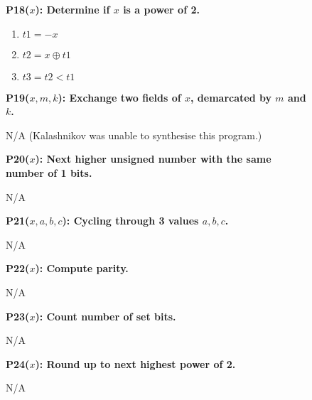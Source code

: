 \begin{figure}
\begin{multicols}{4}
   \begin{minipage}{.2\textwidth}
   \bf{P18}($x$): Determine if $x$ is a power of 2.
   \begin{enumerate}
    \item $t1 = -x$
    \item $t2 = x \oplus t1$
    \item $t3 = t2 < t1$
   \end{enumerate}
   \end{minipage}
   \vspace{12pt}
  
   
   
   \begin{minipage}{.2\textwidth}
   {\bf P19($x, m, k$): Exchange two fields of $x$, demarcated by $m$ and $k$.}

   N/A ({\sc Kalashnikov} was unable to synthesise this program.)
   \end{minipage}
   \vspace{12pt}
   
   \begin{minipage}{.2\textwidth}
   {\bf P20($x$): Next higher unsigned number with the same number of 1 bits.}

   N/A
   \end{minipage}
   \vspace{12pt}
   
   \begin{minipage}{.2\textwidth}
   {\bf P21($x, a, b, c$): Cycling through 3 values $a, b, c$.}

    N/A
   \end{minipage}
   \vspace{12pt}
   
   \begin{minipage}{.2\textwidth}
   {\bf P22($x$): Compute parity.}

    N/A
   \end{minipage}
   \vspace{12pt}
   
   \begin{minipage}{.2\textwidth}
   {\bf P23($x$): Count number of set bits.}

    N/A
   \end{minipage}
      \vspace{12pt}
   
   \begin{minipage}{.2\textwidth}
   {\bf P24($x$): Round up to next highest power of 2.}

    N/A
   \end{minipage}
   \vspace{12pt}
   

\end{multicols}
\end{figure}
